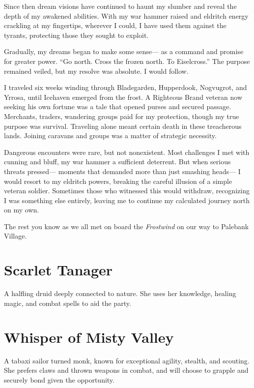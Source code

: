 \documentclass[
  letterpaper,12pt,twoside,twocolumn,openany,
  nodeprecatedcode,bg=full]{dndbook}
\begin{document}
Since then dream visions have continued to haunt my slumber and reveal
the depth of my awakened abilities. With my war hammer raised and
eldritch energy crackling at my fingertips, wherever I could, I have
used them against the tyrants, protecting those they sought to exploit.

Gradually, my dreams began to make some sense--- as a command and
promise for greater power. ``Go north. Cross the frozen north. To
Eiselcross.'' The purpose remained veiled, but my resolve was absolute.
I would follow.

I traveled six weeks winding through Bladegarden, Hupperdook, Nogvugrot,
and Yrrosa, until Icehaven emerged from the frost. A Righteous Brand
veteran now seeking his own fortune was a tale that opened purses and
secured passage. Merchants, traders, wandering groups paid for my
protection, though my true purpose was survival. Traveling alone meant
certain death in these treacherous lands. Joining caravans and groups
was a matter of strategic necessity.

Dangerous encounters were rare, but not nonexistent. Most challenges I
met with cunning and bluff, my war hammer a sufficient deterrent. But
when serious threats pressed--- moments that demanded more than just
smashing heads--- I would resort to my eldritch powers, breaking the
careful illusion of a simple veteran soldier. Sometimes those who
witnessed this would withdraw, recognizing I was something else
entirely, leaving me to continue my calculated journey north on my own.

The rest you know as we all met on board the \emph{Frostwind} on our way
to Palebank Village.

\chapter{Scarlet Tanager}\label{scarlet-tanager}

A halfling druid deeply connected to nature. She uses her knowledge,
healing magic, and combat spells to aid the party.

\chapter{Whisper of Misty Valley}\label{whisper-of-misty-valley}

A tabaxi sailor turned monk, known for exceptional agility, stealth, and
scouting. She prefers claws and thrown weapons in combat, and will
choose to grapple and securely bond given the opportunity.
\end{document}

